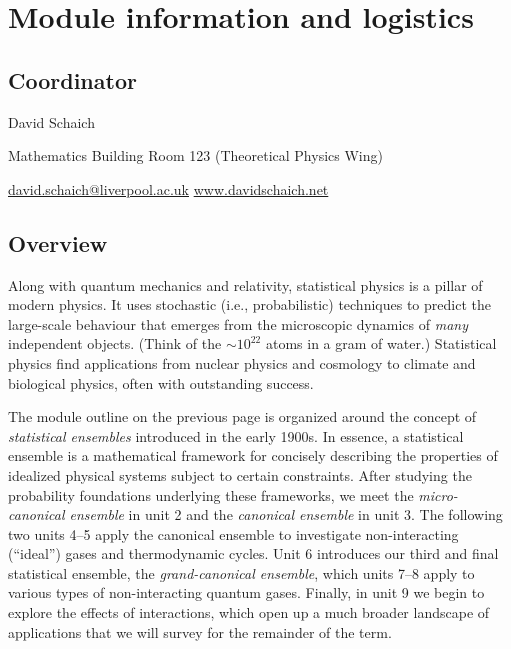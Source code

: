 \newcommand{\thisunit}{MATH327 information}
\newcommand{\moddate}{Last modified 26 Jan.~2022}
\setcounter{section}{0}
{}
\section*{Module information and logistics}

\subsection*{Coordinator}
\begin{description}
  \setlength{\itemsep}{1pt}
  \setlength{\parskip}{0pt}
  \setlength{\parsep}{0pt}
  \item[\qquad] David Schaich
  \item[\qquad] Mathematics Building Room 123 (Theoretical Physics Wing)
  \item[\qquad] \href{mailto:david.schaich@liverpool.ac.uk}{david.schaich@liverpool.ac.uk} \hfill \href{http://www.davidschaich.net}{www.davidschaich.net}
\end{description}



\subsection*{Overview}
Along with quantum mechanics and relativity, statistical physics is a pillar of modern physics.
It uses stochastic (i.e., probabilistic) techniques to predict the large-scale behaviour that emerges from the microscopic dynamics of \emph{many} independent objects.
(Think of the $\sim$$10^{22}$ atoms in a gram of water.)
Statistical physics find applications from nuclear physics and cosmology to climate and biological physics, often with outstanding success.

The module outline on the previous page is organized around the concept of \textit{statistical ensembles} introduced in the early 1900s.
In essence, a statistical ensemble is a mathematical framework for concisely describing the properties of idealized physical systems subject to certain constraints.
After studying the probability foundations underlying these frameworks, we meet the \textit{micro-canonical ensemble} in unit 2 and the \textit{canonical ensemble} in unit 3.
The following two units 4--5 apply the canonical ensemble to investigate non-interacting (``ideal'') gases and thermodynamic cycles.
Unit 6 introduces our third and final statistical ensemble, the \textit{grand-canonical ensemble}, which units 7--8 apply to various types of non-interacting quantum gases.
Finally, in unit 9 we begin to explore the effects of interactions, which open up a much broader landscape of applications that we will survey for the remainder of the term.



